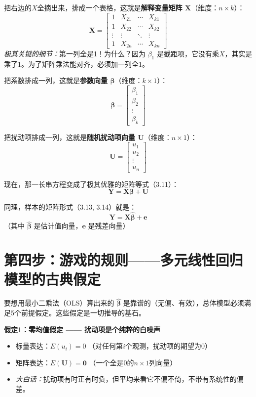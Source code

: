 \documentclass[12pt,a4paper]{ctexart}
\newcommand{\vect}[1]{\mathbf{#1}}
\newcommand{\mat}[1]{\mathbf{#1}}
\begin{document}
把右边的\(X\)全摘出来，排成一个表格，这就是\textbf{解释变量矩阵 \(\mat{X}\)}（维度：\(n\times k\)）：
\[
\mat{X} = \begin{bmatrix}
1 & X_{21} & \cdots & X_{k1} \\
1 & X_{22} & \cdots & X_{k2} \\
\vdots & \vdots & \ddots & \vdots \\
1 & X_{2n} & \cdots & X_{kn}
\end{bmatrix}
\]
\emph{极其关键的细节：}第一列全是1！为什么？因为 \(\beta_1\) 是截距项，它没有乘\(X\)，其实是乘了1。为了矩阵乘法能对齐，必须加一列全1。

把系数排成一列，这就是\textbf{参数向量 \(\boldsymbol{\beta}\)}（维度：\(k\times 1\)）：
\[
\boldsymbol{\beta} = \begin{bmatrix} \beta_1 \\ \beta_2 \\ \vdots \\ \beta_k \end{bmatrix}
\]

把扰动项排成一列，这就是\textbf{随机扰动项向量 \(\vect{U}\)}（维度：\(n\times 1\)）：
\[
\vect{U} = \begin{bmatrix} u_1 \\ u_2 \\ \vdots \\ u_n \end{bmatrix}
\]

现在，那一长串方程变成了极其优雅的矩阵等式（3.11）：
\begin{equation}
\vect{Y} = \mat{X}\boldsymbol{\beta} + \vect{U} \tag{3.11}
\end{equation}

同理，样本的矩阵形式（3.13, 3.14）就是：
\begin{equation}
\vect{Y} = \mat{X}\hat{\boldsymbol{\beta}} + \vect{e} \tag{3.13, 3.14}
\end{equation}
（其中 \(\hat{\boldsymbol{\beta}}\) 是估计值向量，\(\vect{e}\) 是残差向量）

\section*{第四步：游戏的规则——多元线性回归模型的古典假定}

要想用最小二乘法（OLS）算出来的 \(\hat{\boldsymbol{\beta}}\) 是靠谱的（无偏、有效），总体模型必须满足5个前提假定。这些假定是一切推导的基石。

\noindent\textbf{假定1：零均值假定 —— 扰动项是个纯粹的白噪声}
\begin{itemize}
\item 标量表达：\(E(u_i) = 0\) （对任何第\(i\)个观测，扰动项的期望为0）
\item 矩阵表达：\(E(\vect{U}) = \vect{0}\) （一个全是0的\(n\times1\)列向量）
\item \emph{大白话：}扰动项有时正有时负，但平均来看它不偏不倚，不带有系统性的偏差。
\end{itemize}
\end{document}
